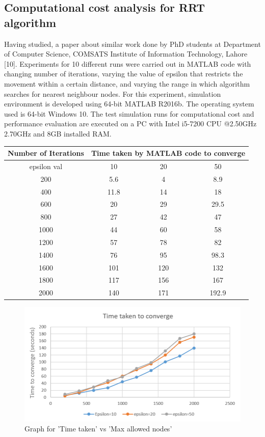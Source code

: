 \documentclass[12pt]{article}
\begin{document}
\subsection{Computational cost analysis for RRT algorithm}
Having studied, a paper about similar work done by PhD students at Department of Computer Science, COMSATS Institute of Information Technology, Lahore [10]. Experiments for  10 different runs were carried out in MATLAB code with changing number of iterations, varying the value of epsilon that restricts the movement within a certain distance, and varying the range in which algorithm searches for nearest neighbour nodes. For this experiment, simulation environment is developed using 64-bit MATLAB R2016b. The operating system used is 64-bit Windows 10. The test simulation runs for computational cost and performance evaluation are executed on a PC with Intel i5-7200 CPU @2.50GHz 2.70GHz and 8GB installed RAM.

\begin{center}
 \begin{tabular}{||c | c | c | c||} 
 \hline
Number of Iterations & \multicolumn{3}{|c|}{Time taken by MATLAB code to converge} \\
 \hline
 \hline
 epsilon val & 10 & 20 & 50 \\  
 \hline
 200 & 5.6 & 4 & 8.9 \\ 
 \hline
 400 & 11.8 & 14 & 18 \\
 \hline
 600 & 20 & 29 & 29.5 \\
 \hline
 800 & 27 & 42 & 47 \\
 \hline
 1000 & 44 & 60 & 58 \\ 
  \hline
 1200 & 57 & 78 & 82 \\ 
 \hline
 1400 & 76 & 95 & 98.3 \\
 \hline
 1600 & 101 & 120 & 132 \\
 \hline
 1800 & 117 & 156 & 167 \\
 \hline
 2000 & 140 & 171 & 192.9 \\ 
 \hline
\end{tabular}
\end{center}

\begin{figure}[H]
    \centering
    \includegraphics[scale=0.65]{Chart.png}
    \captionsetup{labelformat=empty}
    \caption{Graph for 'Time taken' vs 'Max allowed nodes'}
\end{figure}
\end{document}
